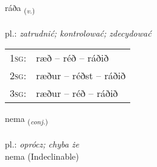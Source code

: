 \documentclass[frontgrid, backgrid]{flacards}\usepackage[]{graphicx}\usepackage[]{xcolor}
\begin{document}
\renewcommand{\blhead}{\vskip5pt {\small\bfseries\footnotesize Sagnorð | czasownik }}
\renewcommand{\bcfoot}{\vskip5pt \hspace{2pt}{\small\bfseries\footnotesize 1K}}


{ráða \small{\textsubscript{(\textit{v.})}} \\[1ex] %
\textphonetic{[rauːða]} \\
pl.: \emph{zatrudnić; kontrolować; zdecydować} \\  [2ex]
\renewcommand*{\arraystretch}{0.8}
\begin{tabular}{p{1cm}l}
\textsc{1sg}: & ræð -- réð -- ráðið \\ 
\textsc{2sg}: & ræður -- réðst -- ráðið \\ 
\textsc{3sg}: & ræður -- réð -- ráðið \\ 
\end{tabular}
}


\renewcommand{\flhead}{\vskip5pt \fboxsep=0pt {\small\bfseries\footnotesize Samtenging | spójnik}}
\renewcommand{\fcfoot}{\vskip5pt \fboxsep=0pt \hspace{2pt}{\small\bfseries\footnotesize 1K}}

\renewcommand{\blhead}{\vskip5pt {\small\bfseries\footnotesize Samtenging | spójnik }}
\renewcommand{\bcfoot}{\vskip5pt \hspace{2pt}{\small\bfseries\footnotesize 1K}}


{nema \small{\textsubscript{(\textit{conj.})}} \\[1ex]
\textphonetic{[nɛːma]} \\
pl.: \emph{oprócz; chyba że} \\  [2ex]
nema (Indeclinable)}

\renewcommand{\flhead}{\vskip5pt \fboxsep=0pt {\small\bfseries\footnotesize Nafnorð | rzeczownik}}
\renewcommand{\fcfoot}{\vskip5pt \fboxsep=0pt \hspace{2pt}{\small\bfseries\footnotesize 1K}}

\renewcommand{\blhead}{\vskip5pt {\small\bfseries\footnotesize Nafnorð | rzeczownik }}
\renewcommand{\bcfoot}{\vskip5pt \hspace{2pt}{\small\bfseries\footnotesize 1K}}
\end{document}
